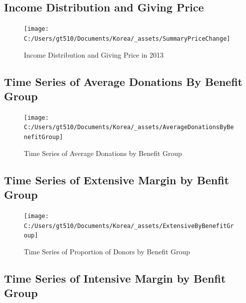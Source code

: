 \documentclass[ review  , 3p ]{elsarticle}
\begin{document}
  \hypertarget{income-distribution-and-giving-price}{%
  \subsection{Income Distribution and Giving Price}\label{income-distribution-and-giving-price}}
  
  \begin{figure}
  
  {\centering \texttt{[image: C:/Users/gt510/Documents/Korea/\_assets/SummaryPriceChange]} 
  
  }
  
  \caption{Income Distribution and Giving Price in 2013}\label{fig:unnamed-chunk-2}
  \end{figure}
  
  \hypertarget{time-series-of-average-donations-by-benefit-group}{%
  \subsection{Time Series of Average Donations By Benefit Group}\label{time-series-of-average-donations-by-benefit-group}}
  
  \begin{figure}
  
  {\centering \texttt{[image: C:/Users/gt510/Documents/Korea/\_assets/AverageDonationsByBenefitGroup]} 
  
  }
  
  \caption{Time Series of Average Donations by Benefit Group}\label{fig:unnamed-chunk-3}
  \end{figure}
  
  \hypertarget{time-series-of-extensive-margin-by-benfit-group}{%
  \subsection{Time Series of Extensive Margin by Benfit Group}\label{time-series-of-extensive-margin-by-benfit-group}}
  
  \begin{figure}
  
  {\centering \texttt{[image: C:/Users/gt510/Documents/Korea/\_assets/ExtensiveByBenefitGroup]} 
  
  }
  
  \caption{Time Series of Proportion of Donors by Benefit Group}\label{fig:unnamed-chunk-4}
  \end{figure}
  
  \hypertarget{time-series-of-intensive-margin-by-benfit-group}{%
  \subsection{Time Series of Intensive Margin by Benfit Group}\label{time-series-of-intensive-margin-by-benfit-group}}
  
\end{document}
